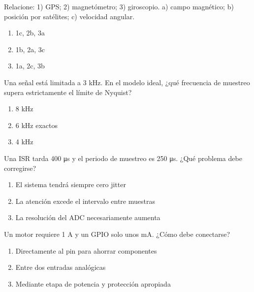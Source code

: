 \noindent\begin{minipage}{\linewidth}\setlength{\parskip}{4pt}\label{q:H-064}
Relacione: 1) GPS; 2) magnetómetro; 3) giroscopio. a) campo magnético; b) posición por satélites; c) velocidad angular.
\begin{enumerate}[label=\Alph*),nosep]
\item 1c, 2b, 3a
\item 1b, 2a, 3c
\item 1a, 2c, 3b
\end{enumerate}\end{minipage}\par\medskip

\noindent\begin{minipage}{\linewidth}\setlength{\parskip}{4pt}\label{q:H-065}
Una señal está limitada a 3 kHz. En el modelo ideal, ¿qué frecuencia de muestreo supera estrictamente el límite de Nyquist?
\begin{enumerate}[label=\Alph*),nosep]
\item 8 kHz
\item 6 kHz exactos
\item 4 kHz
\end{enumerate}\end{minipage}\par\medskip

\noindent\begin{minipage}{\linewidth}\setlength{\parskip}{4pt}\label{q:H-066}
Una ISR tarda 400 μs y el periodo de muestreo es 250 μs. ¿Qué problema debe corregirse?
\begin{enumerate}[label=\Alph*),nosep]
\item El sistema tendrá siempre cero jitter
\item La atención excede el intervalo entre muestras
\item La resolución del ADC necesariamente aumenta
\end{enumerate}\end{minipage}\par\medskip

\noindent\begin{minipage}{\linewidth}\setlength{\parskip}{4pt}\label{q:H-067}
Un motor requiere 1 A y un GPIO solo unos mA. ¿Cómo debe conectarse?
\begin{enumerate}[label=\Alph*),nosep]
\item Directamente al pin para ahorrar componentes
\item Entre dos entradas analógicas
\item Mediante etapa de potencia y protección apropiada
\end{enumerate}\end{minipage}\par\medskip

